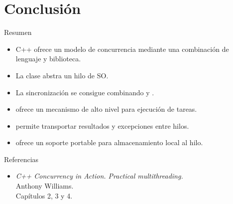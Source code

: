 \section{Conclusión}

\begin{frame}{Resumen}
\begin{itemize}
  \item C++ ofrece un modelo de concurrencia mediante una combinación
        de lenguaje y biblioteca.
  \item La clase  abstra un hilo de SO.
  \item La sincronización se consigue combinando  y .
  \item {} ofrece un mecanismo de alto nivel para ejecución de tareas.
  \item {} permite transportar resultados y excepciones entre hilos.
  \item {} ofrece un soporte portable para almacenamiento local al hilo.
\end{itemize}
\end{frame}

\begin{frame}[t]{Referencias}
\begin{itemize}
  \item \emph{C++ Concurrency in Action. Practical multithreading.}\\
  Anthony Williams.\\
  Capítulos 2, 3 y 4.
\end{itemize}
\end{frame}
